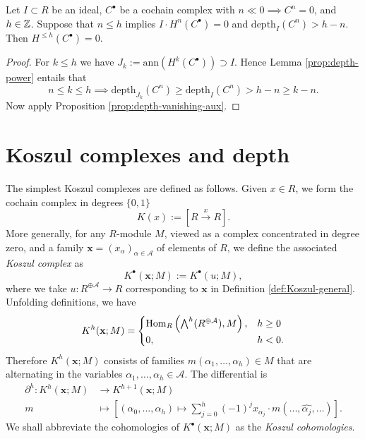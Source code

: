\begin{corollary}\label{prop:depth-vanishing}
	Let $I \subset R$ be an ideal, $C^\bullet$ be a cochain complex with $n \ll 0 \implies C^n=0$, and $h \in \mathbb{Z}$. Suppose that $n \leq h$ implies $I \cdot H^n(C^\bullet) = 0$ and $\mathrm{depth}_I(C^n) > h-n$. Then $H^{\leq h}(C^\bullet) = 0$.
\end{corollary}
\begin{proof}
	For $k \leq h$ we have $J_k := \text{ann}(H^k(C^\bullet)) \supset I$. Hence Lemma \ref{prop:depth-power} entails that
	\[ n \leq k \leq h \implies \text{depth}_{J_k}(C^n) \geq \text{depth}_I(C^n) > h-n \geq k-n. \]
	Now apply Proposition \ref{prop:depth-vanishing-aux}.
\end{proof}

\section{Koszul complexes and depth}
The simplest Koszul complexes are defined as follows. Given $x \in R$, we form the cochain complex in degrees $\{0,1\}$
\[ K(x) := \left[ R \xrightarrow{x} R \right]. \]
More generally, for any $R$-module $M$, viewed as a complex concentrated in degree zero, and a family $\mathbf{x} = (x_\alpha)_{\alpha \in \mathcal{A}}$ of elements of $R$, we define the associated \emph{Koszul complex} as
\[ K^\bullet(\mathbf{x}; M) := K^\bullet(u; M), \]
where we take $u: R^{\oplus \mathcal{A}} \to R$ corresponding to $\mathbf{x}$ in Definition \ref{def:Koszul-general}. Unfolding definitions, we have 
\[ K^h(\mathbf{x}; M) = \begin{cases}
	\operatorname{Hom}_R\left( \bigwedge^h (R^{\oplus \mathcal{A}}), M \right), & h \geq 0 \\
	0, & h < 0. 
\end{cases} \]
Therefore $K^h(\mathbf{x}; M)$ consists of families $m(\alpha_1, \ldots, \alpha_h) \in M$ that are alternating in the variables $\alpha_1, \ldots, \alpha_h \in \mathcal{A}$. The differential is
\begin{align*}
	\partial^h: K^h(\mathbf{x}; M) & \longrightarrow K^{h+1}(\mathbf{x}; M) \\
	m & \longmapsto \left[ (\alpha_0, \ldots, \alpha_h) \mapsto \sum_{j=0}^h (-1)^j x_{\alpha_j} \cdot m(\ldots, \widehat{\alpha_j}, \ldots) \right].
\end{align*}
We shall abbreviate the cohomologies of $K^\bullet(\mathbf{x}; M)$ as the \emph{Koszul cohomologies}.


